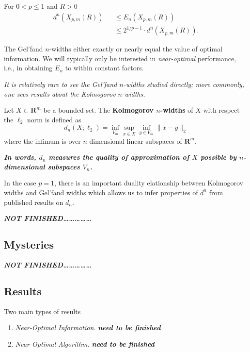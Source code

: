 \begin{theorem}
    For $0<p \leq 1$ and $R>0$
    \begin{eqnarray}
        d^n(X_{p,m}(R))&&\leq E_n(X_{p,m}(R)) \\
        \label{eq3.1.4}
        &&\leq 2^{1/p-1} \cdot d^n(X_{p,m}(R)).
        \label{eq3.1.5}
    \end{eqnarray}
    \label{th3,3}
\end{theorem}

The Gel'fand $n$-widths either exactly or nearly equal the value of optimal information. We will typically only be interested in \emph{near-optimal} performance, i.e., in obtaining $E_n$ to within constant factors.

\emph{\textcolor[rgb]{1,0,0}{It is relatively rare to see the Gel'fand $n$-widths studied directly; more commonly, one sees results about the Kolmogorov $n$-widths.}}

\begin{definition}
    \label{def3.1.2}
    Let $X \subset \mathbf{R}^m$ be a bounded set. The \textbf{Kolmogorov $n$-widths} of $X$ with respect the $\ell_2$ norm is defined as 
    \begin{equation*}
        d_n(X;\ell_2) = \inf\limits_{V_m}\sup\limits_{x \in X}\inf\limits_{y \in V_m} \|x-y\|_2
    \end{equation*}
    where the infimum is over $n$-dimensional linear subspaces of $\mathbf{R}^m$.
\end{definition}

\emph{\textbf{\textcolor[rgb]{1,0,0}{In words, $d_n$ measures the quality of approximation of $X$ possible by $n$-dimensional subspaces $V_n$.}}}

In the case $p=1$, there is an important duality elationship between Kolmogorov widths and Gel'fand widths which allows us to infer properties of $d^n$ from published results on $d_n$. 

\emph{\textbf{\textcolor[rgb]{1,0,0}{NOT FINISHED\dots\dots\dots\dots\dots}}}

\subsection{Mysteries}
\emph{\textbf{\textcolor[rgb]{1,0,0}{NOT FINISHED\dots\dots\dots\dots\dots}}}

\subsection{Results}
Two main types of results
\begin{enumerate}[$\bullet$]
    \item \emph{Near-Optimal Information.} \emph{\textbf{\textcolor[rgb]{1,0,0}{need to be finished}}}
    \item \emph{Near-Optimal Algorithm.} \emph{\textbf{\textcolor[rgb]{1,0,0}{need to be finished}}}
\end{enumerate}

